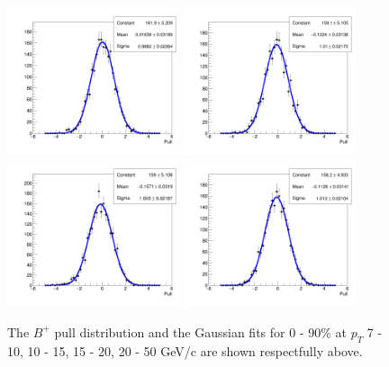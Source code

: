 \begin{figure}[h]
\begin{center}
\includegraphics[width= 0.45\textwidth]{Figures/Chapter4/BP_pull_signal_full_0_0_90.png}
\includegraphics[width= 0.45\textwidth]{Figures/Chapter4/BP_pull_signal_full_1_0_90.png}
\includegraphics[width= 0.45\textwidth]{Figures/Chapter4/BP_pull_signal_full_2_0_90.png}
\includegraphics[width= 0.45\textwidth]{Figures/Chapter4/BP_pull_signal_full_3_0_90.png}
\caption{The $B^+$ pull distribution and the Gaussian fits for 0 - 90\% at $p_T$ 7 - 10, 10 - 15, 15 - 20, 20 - 50 GeV/c are shown respectfully above.} 
\label{BPPtPull} 
\end{center}
\end{figure}


